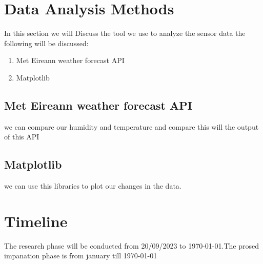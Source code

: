 \section{Data Analysis Methods}
In this section we will Discuss the tool we use to analyze the sensor data the following will be discussed:
\begin{enumerate}
    \item Met Eireann weather forecast API
    \item Matplotlib
\end{enumerate}
\subsection{Met Eireann weather forecast API}
we can compare our humidity and temperature and compare this will the output of this  API
\subsection{Matplotlib}
we can use this libraries to plot our changes in the data.


\section{Timeline}
The research  phase will be  conducted from 20/09/2023 to \today.The prosed impanation phase is from january till \today